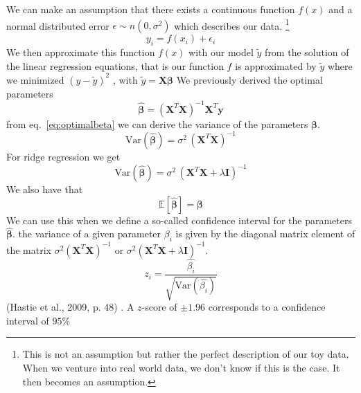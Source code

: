 \documentclass[twoside,11pt]{report}
\begin{document}
We can make an assumption that there exists a continuous function $f (x)$
and a normal distributed error $\epsilon \sim n (0, \sigma^2)$ which describes our data. \footnote{This is not an assumption but rather the perfect description of our toy data. When we venture into real world data,
    we don't know if this is the case. It then becomes an assumption.}
$$ y_i = f (x_i) + \epsilon_i$$
We then approximate this function $f(x)$ with our model $\tilde{y}$ from the solution
of the linear regression equations, that is our
function $f$ is approximated by $\tilde{y}$ where we minimized $(y - \tilde{y})^2$ , with
$\tilde{y} = \mathbf{X}\boldsymbol{\beta}$
We previously derived the optimal parameters
\begin{equation}
    \label{eq:optimalbeta}
\hat{\boldsymbol{\beta}} = \left(\mathbf{X}^T\mathbf{X}\right)^{-1}\mathbf{X}^T\mathbf{y}
\end{equation}
from eq.~\ref{eq:optimalbeta} we can derive the variance of the parameters $\boldsymbol{\beta}$.
$$
\mbox{Var}(\boldsymbol{\hat{\beta}}) = \sigma^2 \, (\mathbf{X}^{T} \mathbf{X})^{-1}
$$
For ridge regression we get
$$
\mbox{Var}(\boldsymbol{\hat{\beta}}) = \sigma^2 \, (\mathbf{X}^{T} \mathbf{X} + \lambda \mathbf{I})^{-1}
$$
We also have that
$$
\mathbb{E}[\boldsymbol{\hat{\beta}}] = \boldsymbol{\beta}
$$
We can use this when we define a so-called confidence interval
for the parameters $\boldsymbol{\hat{\beta}}$. the variance of a given parameter $\beta_i$ is given by the diagonal matrix
element of the matrix $\sigma^2(\mathbf{X}^{T} \mathbf{X})^{-1}$ or $\sigma^2(\mathbf{X}^{T} \mathbf{X} + \lambda \mathbf{I})^{-1}$.
$$
z_i = \frac{\hat{\beta_i}}{\sqrt{\mbox{Var}(\hat{\beta_i})}}
$$
(Hastie et al., 2009, p. 48) \cite{hastie01statisticallearning}. 
A $z$-score of $\pm 1.96$ corresponds to a confidence interval of $95\%$
\end{document}
